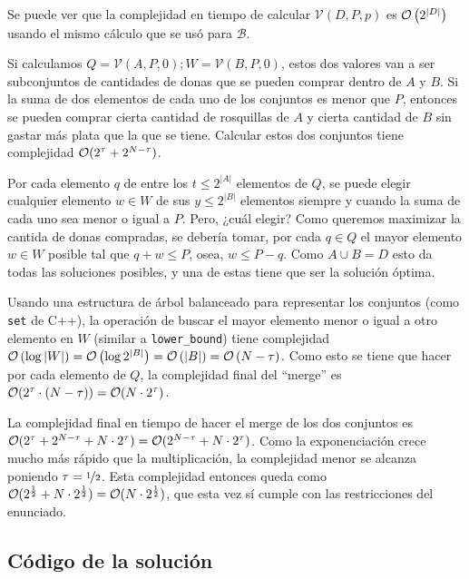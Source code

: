 Se puede ver que la complejidad en tiempo de calcular \( \mathcal{V}(D, P, p) \) es \( \mathcal{O} \left( 2^{\left| D \right|} \right) \) usando el mismo cálculo que se usó para \( \mathcal{B} \).

Si calculamos \( Q = \mathcal{V}(A, P, 0); W = \mathcal{V}(B, P, 0) \), estos dos valores van a ser subconjuntos de cantidades de donas que se pueden comprar dentro de \( A \) y \( B \). Si la suma de dos elementos de cada uno de los conjuntos es menor que \( P \), entonces se pueden comprar cierta cantidad de rosquillas de \( A \) y cierta cantidad de \( B \) sin gastar más plata que la que se tiene. Calcular estos dos conjuntos tiene complejidad \( \mathcal{O}(2^\tau + 2^{N - \tau}) \).

Por cada elemento \( q \) de entre los \( t \leq 2^{\left| A \right|} \) elementos de \( Q \), se puede elegir cualquier elemento \( w \in W \) de sus \( y \leq 2^{\left| B \right|} \) elementos siempre y cuando la suma de cada uno sea menor o igual a \( P \). Pero, ¿cuál elegir? Como queremos maximizar la cantida de donas compradas, se debería tomar, por cada \( q \in Q \) el mayor elemento \( w \in W \) posible tal que \( q + w \leq P \), osea, \( w \leq P - q \). Como \( A \cup B = D \) esto da todas las soluciones posibles, y una de estas tiene que ser la solución óptima.

Usando una estructura de árbol balanceado para representar los conjuntos (como \texttt{set} de C++), la operación de buscar el mayor elemento menor o igual a otro elemento en \( W \) (similar a \texttt{lower\_bound}) tiene complejidad \( \mathcal{O} \left( \log \left| W \right| \right) = \mathcal{O} \left( \log 2^{\left| B \right|} \right) = \mathcal{O} \left( \left| B \right| \right) = \mathcal{O} \left( N - \tau \right) \). Como esto se tiene que hacer por cada elemento de \( Q \), la complejidad final del ``merge'' es \( \mathcal{O} (2^\tau \cdot (N - \tau)) = \mathcal{O} (N \cdot 2^\tau) \).

La complejidad final en tiempo de hacer el merge de los dos conjuntos es \( \mathcal{O}(2^\tau + 2^{N - \tau} + N \cdot 2^\tau) = \mathcal{O}(2^{N - \tau} + N \cdot 2^\tau) \). Como la exponenciación crece mucho más rápido que la multiplicación, la complejidad menor se alcanza poniendo \( \tau = \nicefrac{1}{2} \). Esta complejidad entonces queda como \( \mathcal{O}(2^\frac{1}{2} + N \cdot 2^\frac{1}{2}) = \mathcal{O}(N \cdot 2^\frac{1}{2}) \), que esta vez sí cumple con las restricciones del enunciado.

\newpage{}

\subsection{Código de la solución}

